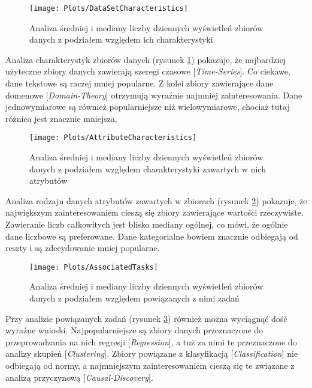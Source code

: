 \begin{figure}[ht]
      \texttt{[image: Plots/DataSetCharacteristics]}
      \caption{Analiza średniej i mediany liczby dziennych wyświetleń zbiorów danych z podziałem względem ich charakterystyki}
      \label{fig:datasetcharacteristics}
\end{figure}

Analiza charakterystyk zbiorów danych (rysunek \ref{fig:datasetcharacteristics}) pokazuje, że najbardziej użyteczne zbiory danych zawierają szeregi czasowe [\emph{Time-Series}].
Co ciekawe, dane tekstowe są raczej mniej popularne.
Z kolei zbiory zawierające dane domenowe [\emph{Domain-Theory}] otrzymują wyraźnie najmniej zainteresowania.
Dane jednowymiarowe są również popularniejsze niż wielowymiarowe, chociaż tutaj różnica jest znacznie mniejsza.

\begin{figure}[ht]
      \texttt{[image: Plots/AttributeCharacteristics]}
      \caption{Analiza średniej i mediany liczby dziennych wyświetleń zbiorów danych z podziałem względem charakterystyki zawartych w nich atrybutów}
      \label{fig:attributecharacteristics}
\end{figure}

Analiza rodzaju danych atrybutów zawartych w zbiorach (rysunek \ref{fig:attributecharacteristics}) pokazuje, że największym zainteresowaniem cieszą się zbiory zawierające wartości rzeczywiste.
Zawieranie liczb całkowitych jest blisko mediany ogólnej, co mówi, że ogólnie dane liczbowe są preferowane.
Dane kategorialne bowiem znacznie odbiegają od reszty i są zdecydowanie mniej popularne.

\begin{figure}[ht]
      \texttt{[image: Plots/AssociatedTasks]}
      \caption{Analiza średniej i mediany liczby dziennych wyświetleń zbiorów danych z podziałem względem powiązanych z nimi zadań}
      \label{fig:associatedtasks}
\end{figure}

Przy analizie powiązanych zadań (rysunek \ref{fig:associatedtasks}) również można wyciągnąć dość wyraźne wnioski.
Najpopularniejsze są zbiory danych przeznaczone do przeprowadzania na nich regresji [\emph{Regression}], a tuż za nimi te przeznaczone do analizy skupień [\emph{Clustering}].
Zbiory powiązane z klasyfikacją [\emph{Classification}] nie odbiegają od normy, a najmniejszym zainteresowaniem cieszą się te związane z analizą przyczynową [\emph{Causal-Discovery}].

